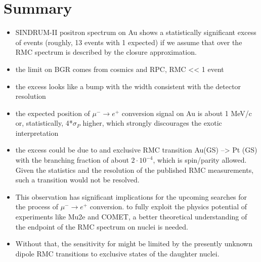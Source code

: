 \documentclass[12pt]{article}
\begin{document}
\newpage
\section{ Summary }

\begin{itemize}
\item
  SINDRUM-II positron spectrum on Au shows a statistically significant excess
  of events (roughly, 13 events with 1 expected) if we assume that over the RMC
  spectrum is described by the closure approximation.
\item
  the limit on BGR comes from cosmics and RPC, RMC << 1  event
\item
  the excess looks like a bump with the width consistent with the detector
  resolution
\item
  the expected position of $\mu^- \rightarrow e^+$ conversion signal on Au is
  about 1 MeV/c or, statistically, 4*$\sigma_P$ higher, which strongly discourages
  the exotic interpretation
\item
  the excess could be due to and exclusive RMC transition Au(GS) --> Pt (GS)
  with the branching fraction of about $2\cdot10^{-4}$, which is spin/parity
  allowed. Given the statistics and the resolution of the published RMC
  measurements, such a transition would not be resolved. 
\item
  This observation has significant implications for the upcoming searches
  for the process of $\mu^- \rightarrow e^+$ conversion. 
  to fully exploit the physics potential of experiments like Mu2e and COMET,
  a better theoretical understanding of the endpoint of the RMC spectrum
  on nuclei is needed. 
\item
  Without that, the sensitivity for might be limited by the presently unknown
  dipole RMC transitions to exclusive states of the daughter nuclei. 
\end{itemize}

% 
% 
% 


\end{document}
